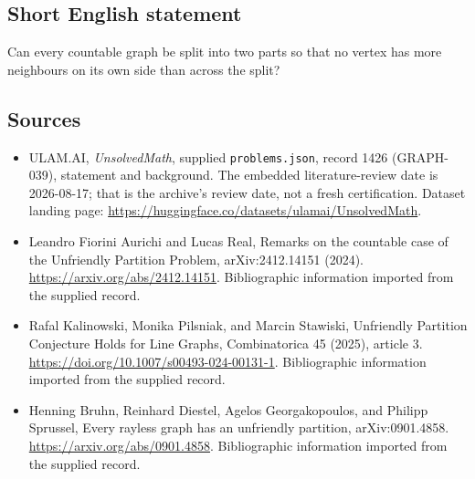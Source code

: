 \documentclass[11pt,a4paper]{article}
\begin{document}
\subsection{Short English statement}

Can every countable graph be split into two parts so that no vertex has more neighbours on its own side than across the split?

\subsection{Sources}

{\small

\begin{itemize}

\item[\hypertarget{source:1426:1}{S1}] ULAM.AI, \emph{UnsolvedMath}, supplied \texttt{problems.json}, record 1426 (GRAPH-039), statement and background. The embedded literature-review date is 2026-08-17; that is the archive’s review date, not a fresh certification. Dataset landing page: \url{https://huggingface.co/datasets/ulamai/UnsolvedMath}.

\item[\hypertarget{source:1426:2}{S2}] Leandro Fiorini Aurichi and Lucas Real, Remarks on the countable case of the Unfriendly Partition Problem, arXiv:2412.14151 (2024). \url{https://arxiv.org/abs/2412.14151}. Bibliographic information imported from the supplied record.

\item[\hypertarget{source:1426:3}{S3}] Rafal Kalinowski, Monika Pilsniak, and Marcin Stawiski, Unfriendly Partition Conjecture Holds for Line Graphs, Combinatorica 45 (2025), article 3. \url{https://doi.org/10.1007/s00493-024-00131-1}. Bibliographic information imported from the supplied record.

\item[\hypertarget{source:1426:4}{S4}] Henning Bruhn, Reinhard Diestel, Agelos Georgakopoulos, and Philipp Sprussel, Every rayless graph has an unfriendly partition, arXiv:0901.4858. \url{https://arxiv.org/abs/0901.4858}. Bibliographic information imported from the supplied record.

\end{itemize}

}

\label{end:1426}
\end{document}
